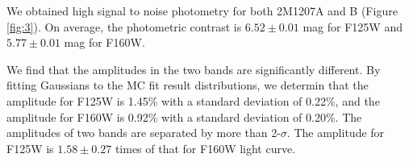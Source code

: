\documentclass[apj]{emulateapj}
\begin{document}
We obtained high signal to noise photometry for both 2M1207A
and B (Figure \ref{fig:3}). On average, the photometric contrast is
$6.52\pm0.01$ mag for F125W and $5.77\pm0.01$ mag for F160W.



We find that the amplitudes in the two bands are
significantly different. By fitting Gaussians to the MC fit result
distributions, we determin that the  amplitude for F125W is
1.45\% with a standard deviation of 0.22\%, and  the amplitude for F160W is
0.92\% with a standard deviation of 0.20\%. The amplitudes of two
bands are separated by more than 2-$\sigma$. The amplitude
for F125W is $1.58\pm0.27$ times of that for F160W light curve.
\end{document}

